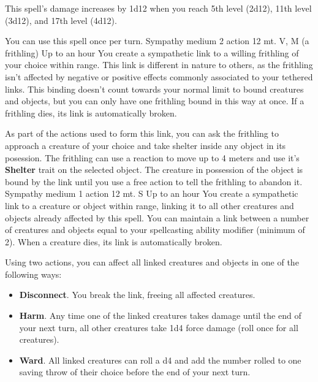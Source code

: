     This spell's damage increases by 1d12 when you reach 5th level (2d12), 11th level (3d12), and 17th level (4d12).

    You can use this spell once per turn.
    {Sympathy medium}
    {2 action}
    {12 mt.}
    {V, M (a frithling)}
    {Up to an hour}
    You create a sympathetic link to a willing frithling of your choice within range.
    This link is different in nature to others, as the frithling isn't affected by negative or positive effects commonly associated to your tethered links.
    This binding doesn't count towards your normal limit to bound creatures and objects, but you can only have one frithling bound in this way at once.
    If a frithling dies, its link is automatically broken.

    As part of the actions used to form this link, you can ask the frithling to approach a creature of your choice and take shelter inside any object in its posession.
    The frithling can use a reaction to move up to 4 meters and use it's \textbf{Shelter} trait on the selected object.
    The creature in possession of the object is bound by the link until you use a free action to tell the frithling to abandon it.
    {Sympathy medium}
    {1 action}
    {12 mt.}
    {S}
    {Up to an hour}
    You create a sympathetic link to a creature or object within range, linking it to all other creatures and objects already affected by this spell.
    You can maintain a link between a number of creatures and objects equal to your spellcasting ability modifier (minimum of 2).
    When a creature dies, its link is automatically broken.

    Using two actions, you can affect all linked creatures and objects in one of the following ways:
    \begin{itemize}
        \item \textbf{Disconnect}.
        You break the link, freeing all affected creatures.
        \item \textbf{Harm}.
        Any time one of the linked creatures takes damage until the end of your next turn, all other creatures take 1d4 force damage (roll once for all creatures).
        \item \textbf{Ward}.
        All linked creatures can roll a d4 and add the number rolled to one saving throw of their choice before the end of your next turn.
    \end{itemize}

\newpage~\newpage

